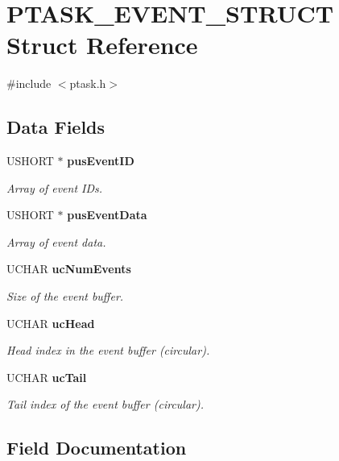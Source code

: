 \section{PTASK\_\-EVENT\_\-STRUCT Struct Reference}
\label{struct_p_t_a_s_k___e_v_e_n_t___s_t_r_u_c_t}


{\ttfamily \#include $<$ptask.h$>$}\subsection*{Data Fields}
\begin{DoxyCompactItemize}
\item 
USHORT $\ast$ {\bf pusEventID}
\begin{DoxyCompactList}\small\item\em Array of event IDs. \item\end{DoxyCompactList}\item 
USHORT $\ast$ {\bf pusEventData}
\begin{DoxyCompactList}\small\item\em Array of event data. \item\end{DoxyCompactList}\item 
UCHAR {\bf ucNumEvents}
\begin{DoxyCompactList}\small\item\em Size of the event buffer. \item\end{DoxyCompactList}\item 
UCHAR {\bf ucHead}
\begin{DoxyCompactList}\small\item\em Head index in the event buffer (circular). \item\end{DoxyCompactList}\item 
UCHAR {\bf ucTail}
\begin{DoxyCompactList}\small\item\em Tail index of the event buffer (circular). \item\end{DoxyCompactList}\end{DoxyCompactItemize}


\subsection{Field Documentation}
